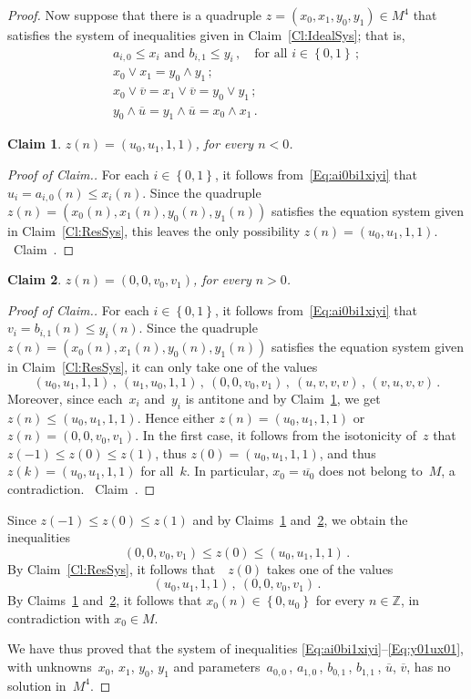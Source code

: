 \documentclass[reqno]{amsart}
\numberwithin{equation}{section}
\theoremstyle{plain}
\newtheorem{claim}{Claim}
\theoremstyle{definition}
\theoremstyle{remark}
\newenvironment{cproof}
{\begin{proof}[Proof of Claim.]}
{{{}~{\rm Claim~{\theclaim}.}}\end{proof}}
\numberwithin{figure}{section}
\numberwithin{table}{section}
\begin{document}
\begin{proof}
Now suppose that there is a quadruple $z=(x_0,x_1,y_0,y_1)\in M^4$ that satisfies the system of inequalities given in Claim~\ref{Cl:IdealSys}; that is,
 \begin{gather}
 a_{i,0}\leq x_i\text{ and }b_{i,1}\leq y_i\,,\quad\text{for all }i\in{\left\{{0,1}\right\}}\,;
 \label{Eq:ai0bi1xiyi}\\
 x_0\vee x_1=y_0\wedge y_1\,;\label{Eq:x01y01}\\
 x_0\vee{\overline{{v}}}=x_1\vee{\overline{{v}}}=y_0\vee y_1\,;\label{Eq:x01vy01}\\
 y_0\wedge{\overline{{u}}}=y_1\wedge{\overline{{u}}}=x_0\wedge x_1\,.\label{Eq:y01ux01}
 \end{gather}

\begin{claim}\label{Cl:z(<0)}
$z(n)=(u_0,u_1,1,1)$, for every $n<0$.
\end{claim}

\begin{cproof}
For each $i\in{\left\{{0,1}\right\}}$, it follows from~\eqref{Eq:ai0bi1xiyi} that $u_i=a_{i,0}(n)\leq x_i(n)$.
Since the quadruple $z(n)=(x_0(n),x_1(n),y_0(n),y_1(n))$ satisfies the equation system given in Claim~\ref{Cl:ResSys}, this leaves the only possibility $z(n)=(u_0,u_1,1,1)$.
\end{cproof}

\begin{claim}\label{Cl:z(>0)}
$z(n)=(0,0,v_0,v_1)$, for every $n>0$.
\end{claim}

\begin{cproof}
For each $i\in{\left\{{0,1}\right\}}$, it follows from~\eqref{Eq:ai0bi1xiyi} that $v_i=b_{i,1}(n)\leq y_i(n)$.
Since the quadruple $z(n)=(x_0(n),x_1(n),y_0(n),y_1(n))$ satisfies the equation system given in Claim~\ref{Cl:ResSys}, it can only take one of the values
 \[
 (u_0,u_1,1,1)\,,\ (u_1,u_0,1,1)\,,\ (0,0,v_0,v_1)\,,\ (u,v,v,v)\,,\, (v,u,v,v)\,.
 \]
Moreover, since each~$x_i$ and~$y_i$ is antitone and by Claim~\ref{Cl:z(<0)}, we get $z(n)\leq(u_0,u_1,1,1)$.
Hence either $z(n)=(u_0,u_1,1,1)$ or $z(n)=(0,0,v_0,v_1)$.
In the first case, it follows from the isotonicity of~$z$ that $z(-1)\leq z(0)\leq z(1)$, thus $z(0)=(u_0,u_1,1,1)$, and thus $z(k)=(u_0,u_1,1,1)$ for all~$k$.
In particular, $x_0={\overline{{u_0}}}$ does not belong to~$M$, a contradiction.
\end{cproof}

Since $z(-1)\leq z(0)\leq z(1)$ and by Claims~\ref{Cl:z(<0)} and~\ref{Cl:z(>0)}, we obtain the inequalities
 \[
 (0,0,v_0,v_1)\leq z(0)\leq(u_0,u_1,1,1)\,.
 \]
By Claim~\ref{Cl:ResSys}, it follows that~ $z(0)$ takes one of the values
 \[
 (u_0,u_1,1,1)\,,\ (0,0,v_0,v_1)\,.
 \]
By Claims~\ref{Cl:z(<0)} and~\ref{Cl:z(>0)}, it follows that $x_0(n)\in{\left\{{0,u_0}\right\}}$ for every $n\in{\mathbb{Z}}$, in contradiction with $x_0\in M$.

We have thus proved that the system of inequalities \eqref{Eq:ai0bi1xiyi}--\eqref{Eq:y01ux01}, with unknowns~$x_0$, $x_1$, $y_0$, $y_1$ and parameters~$a_{0,0}$\,, $a_{1,0}$\,, $b_{0,1}$\,, $b_{1,1}$\,, ${\overline{{u}}}$, ${\overline{{v}}}$, has no solution in~$M^4$.
\end{proof}
\end{document}
